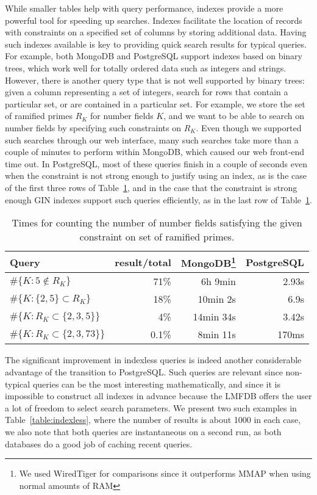 \documentclass{amsart}
\begin{document}
While smaller tables help with query performance, indexes provide a more powerful tool for speeding up searches.
Indexes facilitate the location of records with constraints on a specified set of columns by storing additional data.
Having such indexes available is key to providing quick search results for typical queries.
For example, both MongoDB and PostgreSQL support indexes based on binary trees, which work well for totally ordered data such as integers and strings.
However, there is another query type that is not well supported by binary trees: given a column representing a set of integers, search for rows that contain a particular set, or are contained in a particular set.
For example, we store the set of ramified primes $R_K$ for number fields $K$, and we want to be able to search on number fields by specifying such constraints on $R_K$.
Even though we supported such searches through our web interface, many such searches take more than a couple of minutes to perform within MongoDB, which caused our web front-end time out.
In PostgreSQL, most of these queries finish in a couple of seconds even when the constraint is not strong enough to justify using an index, as is the case of the first three rows of Table~\ref{table:ramps}, and in the case that the constraint is strong enough GIN indexes support such queries efficiently, as in the last row of Table~\ref{table:ramps}.
\begin{table}[h!]
  \begin{center}
  \begin{tabular}{l|r|r|r}
    Query & result/total & MongoDB\footnote{We used WiredTiger for comparisons since it outperforms MMAP when using normal amounts of RAM} & PostgreSQL\\
\hline
$\#\{K : 5 \notin R_K \}$ & 71\% & 6h 9min & 2.93s \\
$\#\{K : \{2, 5\} \subset R_K\}$ & 18\% &10min 2s & 6.9s\\
$\#\{K: R_K \subset \{2, 3, 5\} \}$ & 4\% & 14min 34s & 3.42s\\
$\#\{K: R_K \subset \{2, 3, 73\} \}$ & 0.1\% & 8min 11s & 170ms
\end{tabular}
\caption{Times for counting the number of number fields satisfying the given constraint on set of ramified primes.}
\label{table:ramps}
\end{center}
\end{table}


The significant improvement in indexless queries is indeed another considerable advantage of the transition to PostgreSQL.
Such queries are relevant since non-typical queries can be the most interesting mathematically, and since it is impossible to construct all indexes in advance because the LMFDB offers the user a lot of freedom to select search parameters.
We present two such examples in Table~\ref{table:indexless}, where the number of results is about 1000 in each case, we also note that both queries are instantaneous on a second run, as both databases do a good job of caching recent queries.
\end{document}
